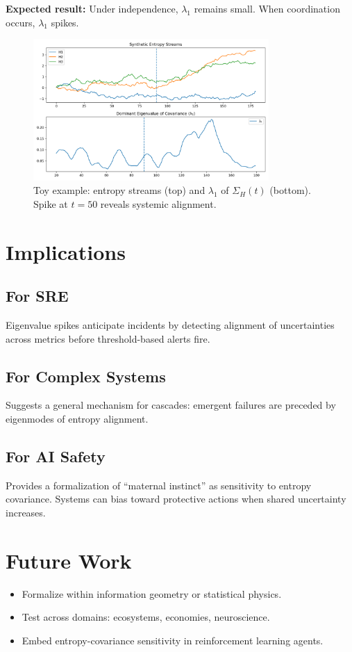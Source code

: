 \documentclass[11pt]{article}
\begin{document}
\noindent \textbf{Expected result:} Under independence, $\lambda_1$ remains small. 
When coordination occurs, $\lambda_1$ spikes. 

\begin{figure}[h]
\centering
\includegraphics[width=0.8\textwidth]{toy_example_plot.png}
\caption{Toy example: entropy streams (top) and $\lambda_1$ of $\Sigma_H(t)$ (bottom). 
Spike at $t=50$ reveals systemic alignment.}
\end{figure}

\section{Implications}
\subsection{For SRE}
Eigenvalue spikes anticipate incidents by detecting alignment of uncertainties across metrics 
before threshold-based alerts fire.

\subsection{For Complex Systems}
Suggests a general mechanism for cascades: emergent failures are preceded by eigenmodes 
of entropy alignment.

\subsection{For AI Safety}
Provides a formalization of ``maternal instinct'' as sensitivity to entropy covariance. 
Systems can bias toward protective actions when shared uncertainty increases.

\section{Future Work}
\begin{itemize}
    \item Formalize within information geometry or statistical physics.
    \item Test across domains: ecosystems, economies, neuroscience.
    \item Embed entropy-covariance sensitivity in reinforcement learning agents.
\end{itemize}
\end{document}

